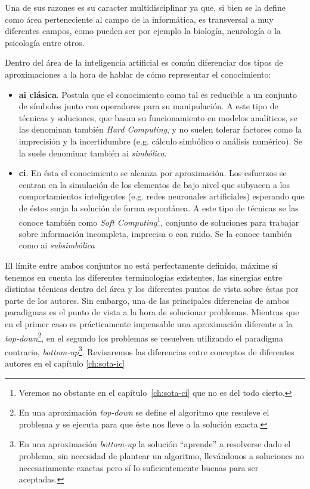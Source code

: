 Una de sus razones es su caracter multidisciplinar ya que, si bien se la define como área perteneciente al campo de la informática, es transversal a muy diferentes campos, como pueden ser por ejemplo la biología, neurología o la psicología entre otros.

Dentro del área de la inteligencia artificial es común diferenciar dos tipos de aproximaciones a la hora de hablar de cómo representar el conocimiento:

\begin{itemize}
	\item \textbf{\ac{ai} clásica}. Postula que el conocimiento como tal es reducible a un conjunto de símbolos junto con operadores para su manipulación. A este tipo de técnicas y soluciones, que basan su funcionamiento en modelos analíticos, se las denominan también \textit{Hard Computing}, y no suelen tolerar factores como la imprecisión y la incertidumbre (e.g. cálculo simbólico o análisis numérico). Se la suele denominar también \ac{ai} \textit{simbólica}.
	\item \textbf{\ac{ci}}. En ésta el conocimiento se alcanza por aproximación. Los esfuerzos se centran en la simulación de los elementos de bajo nivel que subyacen a los comportamientos inteligentes (e.g. redes neuronales artificiales) esperando que de éstos surja la solución de forma espontánea. A este tipo de técnicas se las conoce también como \textit{Soft Computing}\footnote{Veremos no obstante en el capítulo~\ref{ch:sota-ci} que no es del todo cierto.}, conjunto de soluciones para trabajar sobre información incompleta, imprecisa o con ruido. Se la conoce también como \ac{ai} \textit{subsimbólica}
\end{itemize}

El límite entre ambos conjuntos no está perfectamente definido, máxime si tenemos en cuenta las diferentes terminologías existentes, las sinergias entre distintas técnicas dentro del área y los diferentes puntos de vista sobre éstas por parte de los autores. Sin embargo, una de las principales diferencias de ambos paradigmas es el punto de vista a la hora de solucionar problemas. Mientras que en el primer caso es prácticamente impensable una aproximación diferente a la \textit{top-down}\footnote{En una aproximación \textit{top-down} se define el algoritmo que resuleve el problema y se ejecuta para que éste nos lleve a la solución exacta.}, en el segundo los problemas se resuelven utilizando el paradigma contrario, \textit{bottom-up}\footnote{En una aproximación \textit{bottom-up} la solución \enquote{aprende} a resolverse dado el problema, sin necesidad de plantear un algoritmo, llevándonos a soluciones no necesariamente exactas pero sí lo suficientemente buenas para ser aceptadas.}. Revisaremos las diferencias entre conceptos de diferentes autores en el capítulo \ref{ch:sota-ic}


